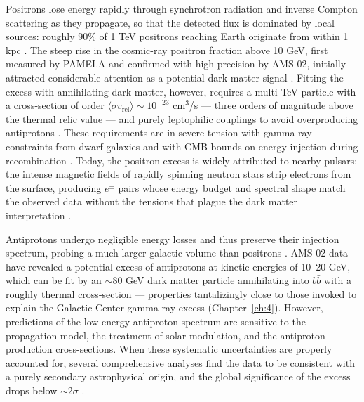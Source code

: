 Positrons lose energy rapidly through synchrotron radiation and inverse Compton scattering as they propagate, so that the detected flux is dominated by local sources: roughly 90\% of 1 TeV positrons reaching Earth originate from within 1 kpc \cite{Cirelli:2024ssz}.
The steep rise in the cosmic-ray positron fraction above 10 GeV, first measured by PAMELA and confirmed with high precision by AMS-02, initially attracted considerable attention as a potential dark matter signal \cite{PAMELA:2008gwm,Cirelli:2024ssz}.
Fitting the excess with annihilating dark matter, however, requires a multi-TeV particle with a cross-section of order $\langle \sigma v_\text{rel} \rangle \sim 10^{-23}$ cm$^3$/s --- three orders of magnitude above the thermal relic value --- and purely leptophilic couplings to avoid overproducing antiprotons \cite{Cirelli:2024ssz}.
These requirements are in severe tension with gamma-ray constraints from dwarf galaxies and with CMB bounds on energy injection during recombination \cite{Cirelli:2024ssz}.
Today, the positron excess is widely attributed to nearby pulsars: the intense magnetic fields of rapidly spinning neutron stars strip electrons from the surface, producing $e^\pm$ pairs whose energy budget and spectral shape match the observed data without the tensions that plague the dark matter interpretation \cite{Cirelli:2024ssz,Hooper:2024}.

Antiprotons undergo negligible energy losses and thus preserve their injection spectrum, probing a much larger galactic volume than positrons \cite{Cirelli:2024ssz}.
AMS-02 data have revealed a potential excess of antiprotons at kinetic energies of 10--20 GeV, which can be fit by an $\sim$80 GeV dark matter particle annihilating into $b\bar{b}$ with a roughly thermal cross-section \cite{Cuoco:2016eej,Cirelli:2024ssz} --- properties tantalizingly close to those invoked to explain the Galactic Center gamma-ray excess (Chapter~\ref{ch:4}).
However, predictions of the low-energy antiproton spectrum are sensitive to the propagation model, the treatment of solar modulation, and the antiproton production cross-sections.
When these systematic uncertainties are properly accounted for, several comprehensive analyses find the data to be consistent with a purely secondary astrophysical origin, and the global significance of the excess drops below $\sim 2\sigma$ \cite{Cirelli:2024ssz}.

